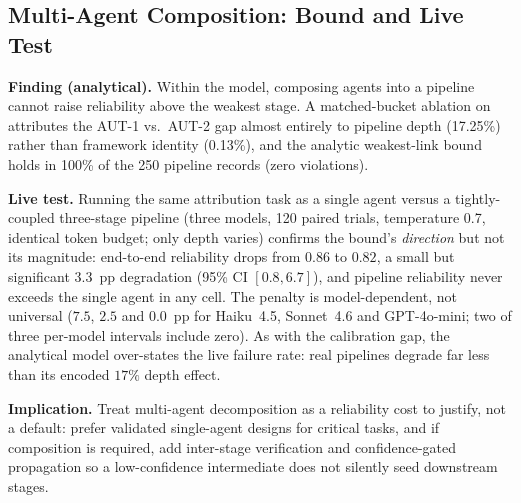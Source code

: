 \subsection{Multi-Agent Composition: Bound and Live Test}

\textbf{Finding (analytical).} Within the model, composing agents into
a pipeline cannot raise reliability above the weakest stage. A
matched-bucket ablation on \SAFK{} attributes the AUT-1 vs.\ AUT-2 gap
almost entirely to pipeline depth (17.25\%) rather than framework
identity (0.13\%), and the analytic weakest-link bound holds in 100\%
of the 250 pipeline records (zero violations).

\textbf{Live test.} Running the same attribution task as a single agent
versus a tightly-coupled three-stage pipeline (three models, 120 paired
trials, temperature 0.7, identical token budget; only depth varies)
confirms the bound's \emph{direction} but not its magnitude: end-to-end
reliability drops from $0.86$ to $0.82$, a small but significant
$3.3$~pp degradation (95\% CI $[0.8, 6.7]$), and pipeline reliability
never exceeds the single agent in any cell. The penalty is
model-dependent, not universal ($7.5$, $2.5$ and $0.0$~pp for
Haiku~4.5, Sonnet~4.6 and GPT-4o-mini; two of three per-model intervals
include zero). As with the calibration gap, the
analytical model over-states the live failure rate: real pipelines
degrade far less than its encoded $17\%$ depth effect.

\textbf{Implication.} Treat multi-agent decomposition as a reliability
cost to justify, not a default: prefer validated single-agent designs
for critical tasks, and if composition is required, add inter-stage
verification and confidence-gated propagation so a low-confidence
intermediate does not silently seed downstream stages.
